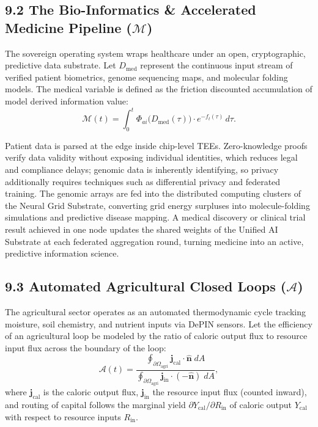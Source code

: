 \documentclass[11pt,a4paper]{article}
\theoremstyle{definition}
\theoremstyle{plain}
\theoremstyle{remark}
\begin{document}
\subsection*{9.2 The Bio-Informatics \& Accelerated Medicine Pipeline ($\mathcal M$)}
The sovereign operating system wraps healthcare under an open, cryptographic, predictive data substrate. Let $D_{\mathrm{med}}$ represent the continuous input stream of verified patient biometrics, genome sequencing maps, and molecular folding models. The medical variable is defined as the friction discounted accumulation of model derived information value:
\begin{equation}
\mathcal M(t) = \int_0^t \Phi_{ai}\big( D_{\mathrm{med}}(\tau) \big) \cdot e^{-f_t(\tau)}\, d\tau .
\end{equation}

Patient data is parsed at the edge inside chip-level TEEs. Zero-knowledge proofs verify data validity without exposing individual identities, which reduces legal and compliance delays; genomic data is inherently identifying, so privacy additionally requires techniques such as differential privacy and federated training. The genomic arrays are fed into the distributed computing clusters of the Neural Grid Substrate, converting grid energy surpluses into molecule-folding simulations and predictive disease mapping. A medical discovery or clinical trial result achieved in one node updates the shared weights of the Unified AI Substrate at each federated aggregation round, turning medicine into an active, predictive information science.

\subsection*{9.3 Automated Agricultural Closed Loops ($\mathcal A$)}
The agricultural sector operates as an automated thermodynamic cycle tracking moisture, soil chemistry, and nutrient inputs via DePIN sensors. Let the efficiency of an agricultural loop be modeled by the ratio of caloric output flux to resource input flux across the boundary of the loop:
\begin{equation}
\mathcal A(t) = \frac{\oint_{\partial\Omega_{\mathrm{agri}}} \mathbf j_{\mathrm{cal}} \cdot \hat{\mathbf n}\; dA}{\oint_{\partial\Omega_{\mathrm{agri}}} \mathbf j_{\mathrm{in}} \cdot (-\hat{\mathbf n})\; dA},
\end{equation}
where $\mathbf j_{\mathrm{cal}}$ is the caloric output flux, $\mathbf j_{\mathrm{in}}$ the resource input flux (counted inward), and routing of capital follows the marginal yield $\partial Y_{\mathrm{cal}} / \partial R_{\mathrm{in}}$ of caloric output $Y_{\mathrm{cal}}$ with respect to resource inputs $R_{\mathrm{in}}$.
\end{document}
